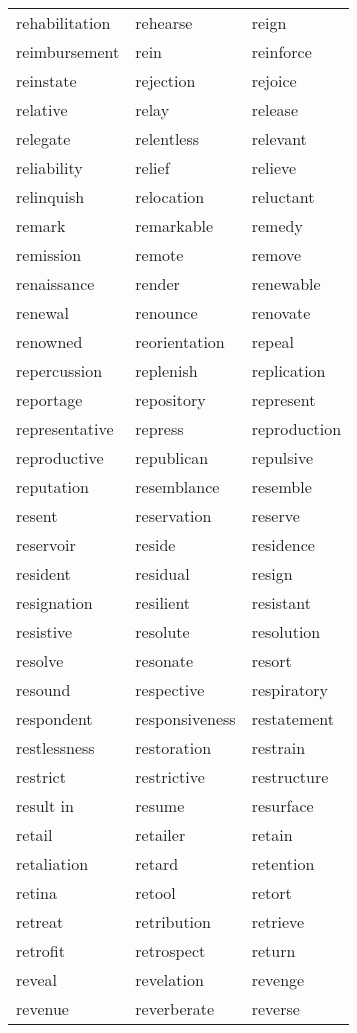 \documentclass{minimal}
\begin{document}
\begin{longtable}{p{2.7cm}@{\hskip 0.2cm}p{2.7cm}@{\hskip 0.2cm}p{2.7cm}}
rehabilitation & rehearse & reign \\
reimbursement & rein & reinforce \\
reinstate & rejection & rejoice \\
relative & relay & release \\
relegate & relentless & relevant \\
reliability & relief & relieve \\
relinquish & relocation & reluctant \\
remark & remarkable & remedy \\
remission & remote & remove \\
renaissance & render & renewable \\
renewal & renounce & renovate \\
renowned & reorientation & repeal \\
repercussion & replenish & replication \\
reportage & repository & represent \\
representative & repress & reproduction \\
reproductive & republican & repulsive \\
reputation & resemblance & resemble \\
resent & reservation & reserve \\
reservoir & reside & residence \\
resident & residual & resign \\
resignation & resilient & resistant \\
resistive & resolute & resolution \\
resolve & resonate & resort \\
resound & respective & respiratory \\
respondent & responsiveness & restatement \\
restlessness & restoration & restrain \\
restrict & restrictive & restructure \\
result in & resume & resurface \\
retail & retailer & retain \\
retaliation & retard & retention \\
retina & retool & retort \\
retreat & retribution & retrieve \\
retrofit & retrospect & return \\
reveal & revelation & revenge \\
revenue & reverberate & reverse \\

\end{longtable}
\end{document}
